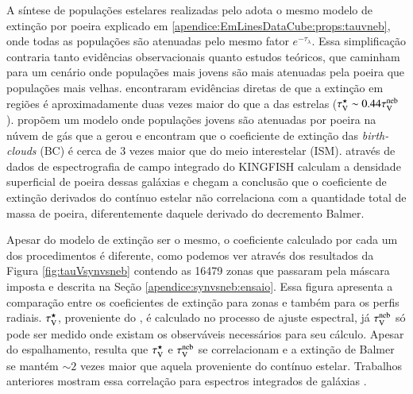 A síntese de populações estelares realizadas pelo \starlight adota o mesmo modelo de extinção por poeira explicado em \ref{apendice:EmLinesDataCube:props:tauvneb}, onde todas as populações são atenuadas pelo mesmo fator $e^{-\tau_\lambda}$. Essa simplificação contraria tanto evidências observacionais quanto estudos teóricos, que caminham para um cenário onde populações mais jovens são mais atenuadas pela poeira que populações mais velhas. \citet{Calzetti.etal.1994a} encontraram evidências diretas de que a extinção em regiões \Hii é aproximadamente duas vezes maior do que a das estrelas ($\tau_{\mathrm{V}}^\star \sim 0.44 \tau_{\mathrm{V}}^{\mathrm{neb}}$). \citet{Charlot.Fall.2000a} propõem um modelo onde populações jovens são atenuadas por poeira na núvem de gás que a gerou e encontram que o coeficiente de extinção das {\em birth-clouds} (BC) é cerca de 3 vezes maior que  do meio interestelar (ISM). \citet{Kreckel.etal.2013a} através de dados de espectrografia de campo integrado do KINGFISH \citep{Kennicutt.etal.2011a} calculam a densidade superficial de poeira dessas galáxias e chegam a conclusão que o coeficiente de extinção derivados do contínuo estelar não correlaciona com a quantidade total de massa de poeira, diferentemente daquele derivado do decremento Balmer.

Apesar do modelo de extinção ser o mesmo, o coeficiente calculado por cada um dos procedimentos é diferente, como podemos ver através dos resultados da Figura \ref{fig:tauVsynvsneb} contendo as 16479 zonas que passaram pela máscara imposta e descrita na Seção \ref{apendice:synvsneb:ensaio}. Essa figura apresenta a comparação entre os coeficientes de extinção para zonas e também para os perfis radiais. $\tau_{\mathrm{V}}^\star$, proveniente do \starlight, é calculado no processo de ajuste espectral, já $\tau_{\mathrm{V}}^{\mathrm{neb}}$ só pode ser medido onde existam os observáveis necessários para seu cálculo. Apesar do espalhamento, resulta que $\tau_{\mathrm{V}}^\star$ e $\tau_{\mathrm{V}}^{\mathrm{neb}}$ se correlacionam e a extinção de Balmer se mantém $\sim 2$ vezes maior que aquela proveniente do contínuo estelar. Trabalhos anteriores mostram essa correlação para espectros integrados de galáxias \citep{Stasinska.etal.2004a, CidFernandes.etal.2005a, Asari.etal.2007a}.

